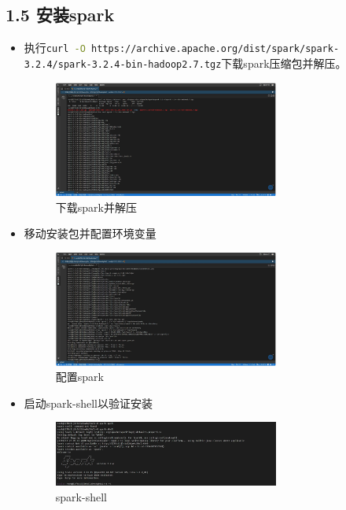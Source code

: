 \documentclass{article}
\begin{document}
\subsection*{1.5 安装spark}
\begin{itemize}
    \item 执行\lstinline[language=bash]|curl -O https://archive.apache.org/dist/spark/spark-3.2.4/spark-3.2.4-bin-hadoop2.7.tgz|下载spark压缩包并解压。
          \begin{figure}[H]
              \centering
              \includegraphics[width=0.7\textwidth]{./pic/15.jpg}
              \caption{下载spark并解压}
          \end{figure}
    \item 移动安装包并配置环境变量
          \begin{figure}[H]
              \centering
              \includegraphics[width=0.7\textwidth]{./pic/16.jpg}
              \caption{配置spark}
          \end{figure}
    \item 启动spark-shell以验证安装
          \begin{figure}[H]
              \centering
              \includegraphics[width=0.7\textwidth]{./pic/17.jpg}
              \caption{spark-shell}
          \end{figure}
\end{itemize}
\end{document}
